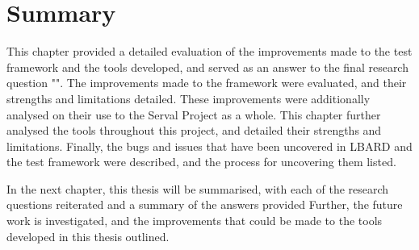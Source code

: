 \section{Summary}
This chapter provided a detailed evaluation of the improvements made to the test framework and the tools developed, and served as an answer to the final research question "\fourthRQ".
The improvements made to the framework were evaluated, and their strengths and limitations detailed.
These improvements were additionally analysed on their use to the Serval Project as a whole.
This chapter further analysed the tools throughout this project, and detailed their strengths and limitations.
Finally, the bugs and issues that have been uncovered in LBARD and the test framework were described, and the process for uncovering them listed.

In the next chapter, this thesis will be summarised, with each of the research questions reiterated and a summary of the answers provided
Further, the future work is investigated, and the improvements that could be made to the tools developed in this thesis outlined.